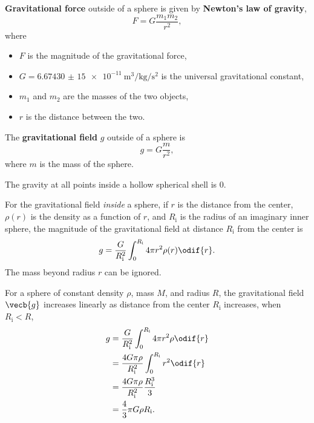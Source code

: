 \textbf{Gravitational force} outside of a sphere is given by
\textbf{Newton's law of gravity},
\begin{equation} \label{eq:newtons-law-of-gravity}
    F = G \frac{m_1 m_2}{r^2},
\end{equation}
where
\begin{itemize}
    \item \(F\) is the magnitude of the gravitational force,
    \item \(G = \qty{6.674 30(15)e-11}{\metre\cubed \per \kilogram \per
        \second\squared}\)
        is the universal gravitational constant, \autocite{nist-G}
    \item \(m_1\) and \(m_2\) are the masses of the two objects,
    \item \(r\) is the distance between the two.
\end{itemize}

The \textbf{gravitational field} \(g\) outside of a sphere is
\begin{equation}
    g = G \frac{m}{r^2},
\end{equation}
where \(m\) is the mass of the sphere.

The gravity at all points inside a hollow spherical shell is 0.

For the gravitational field \emph{inside} a sphere,
if \(r\) is the distance from the center,
\(\rho(r)\) is the density as a function of \(r\),
and \(R_\mathrm{i}\) is the radius of an imaginary inner sphere,
the magnitude of the gravitational field at distance \(R_\mathrm{i}\)
from the center is
\begin{equation}
    g = \frac{G}{R_\mathrm{i}^2} \int_{0}^{R_\mathrm{i}} 4\pi r^2
    \rho(r) \odif{r}.
\end{equation}
The mass beyond radius \(r\) can be ignored.

For a sphere of constant density \(\rho\), mass \(M\), and radius \(R\),
the gravitational field \(\vecb{g}\) increases linearly
as distance from the center \(R_\mathrm{i}\) increases, when
\(R_\mathrm{i} < R\),
\begin{equation}
    \begin{aligned}
        g &= \frac{G}{R_\mathrm{i}^2} \int_{0}^{R_\mathrm{i}} 4\pi
        r^2 \rho \odif{r} \\
        &= \frac{4 G \pi \rho}{R_\mathrm{i}^2}
        \int_{0}^{R_\mathrm{i}} r^2 \odif{r} \\
        &= \frac{4 G \pi \rho}{R_\mathrm{i}^2} \frac{R_\mathrm{i}^3}{3} \\
        &= \frac{4}{3} \pi G \rho R_\mathrm{i}.
    \end{aligned}
\end{equation}

